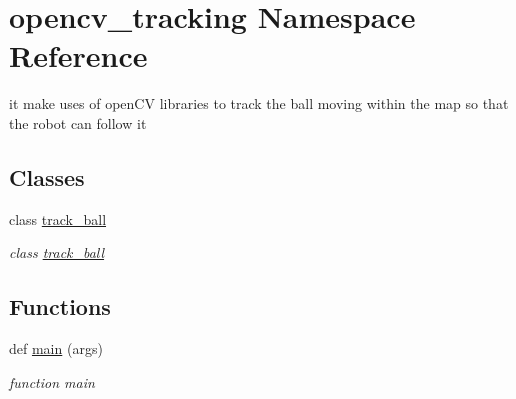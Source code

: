 \hypertarget{namespaceopencv__tracking}{}\section{opencv\+\_\+tracking Namespace Reference}
\label{namespaceopencv__tracking}


it make uses of open\+CV libraries to track the ball moving within the map so that the robot can follow it  


\subsection*{Classes}
\begin{DoxyCompactItemize}
\item 
class \hyperlink{classopencv__tracking_1_1track__ball}{track\+\_\+ball}
\begin{DoxyCompactList}\small\item\em class \hyperlink{classopencv__tracking_1_1track__ball}{track\+\_\+ball} \end{DoxyCompactList}\end{DoxyCompactItemize}
\subsection*{Functions}
\begin{DoxyCompactItemize}
\item 
def \hyperlink{namespaceopencv__tracking_a5907a41ecff5bba825ea991875098ac4}{main} (args)
\begin{DoxyCompactList}\small\item\em function main \end{DoxyCompactList}\end{DoxyCompactItemize}
